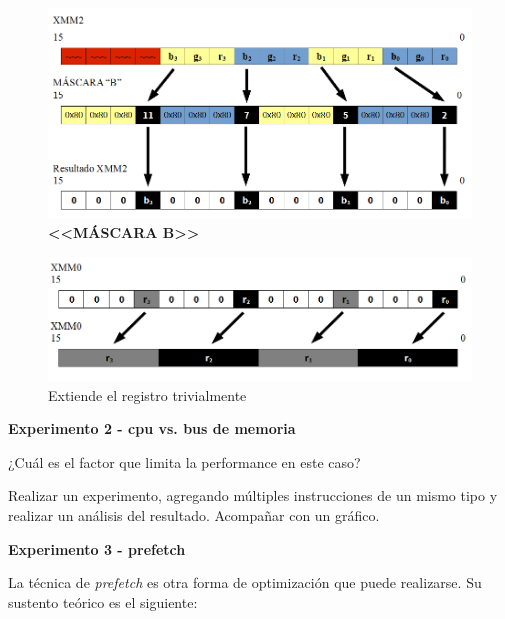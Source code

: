 \begin{figure}[h]
  \begin{center}
  \includegraphics[scale=0.55]{imagenes/popart-mask-b.png}
  \caption{\textbf{<<MÁSCARA B>>}}
  \label{fig:popart_mask_b}
  \end{center}
\end{figure}

\begin{figure}[h]
  \begin{center}
  \includegraphics[scale=0.66]{imagenes/popart-extiende-r.png}
  \caption{Extiende el registro trivialmente}
  \label{fig:popart_extiende_r}
  \end{center}
\end{figure}



\clearpage

\vspace*{0.3cm} \noindent
\textbf{Experimento 2 - cpu vs. bus de memoria}

	¿Cuál es el factor que limita la performance en este caso? 
	
	Realizar un experimento, agregando múltiples instrucciones de un mismo tipo
	y realizar un análisis 	del resultado. Acompañar con un gráfico.


\vspace*{0.3cm} \noindent
\textbf{Experimento 3 - prefetch}

  La técnica de \textit{prefetch} es otra forma de optimización que puede
  realizarse. Su sustento teórico es el siguiente:
  
